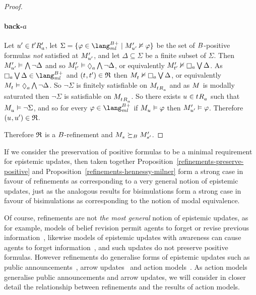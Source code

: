 \begin{proof}
\paragraph{back-$a$}
Let ${u}^{\prime} \in {{t}^{\prime}} {R^{\prime}_{a}}$, let $\Sigma = \{\phi \in \langMlPlusBs \mid \kPModelP{\kStateUP} \nentails \phi\}$ be the set of $B$-positive formulas {\em not} satisfied at ${M^{\prime}_{{u}^{\prime}}}$, and let $\Delta \subseteq \Sigma$ be a finite subset of $\Sigma$.
Then ${M^{\prime}_{{u}^{\prime}}} \vDash \bigwedge \lnot \Delta$ and so $\kPModelP{\kStateTP} \entails \possibleA \bigwedge \lnot \Delta$, or equivalently $\kPModelP{\kStateTP} \nentails \necessaryA \bigvee \Delta$.
As $\necessaryA \bigvee \Delta \in \langMlPlusBs$ and $(\kStateT, \kStateTP) \in \refinement$ then $\kPModel{\kStateT} \nentails \necessaryA \bigvee \Delta$, or equivalently $\kPModel{\kStateT} \entails \possibleA \bigwedge \lnot \Delta$.
So $\lnot \Sigma$ is finitely satisfiable on $\kPModel{\kSuccessorsA{\kStateT}}$ and as $\kModel$ is modally saturated then $\lnot \Sigma$ is satisfiable on $\kPModel{\kSuccessorsA{\kStateT}}$.
So there exists $\kStateU \in \kSuccessorsA{\kStateT}$ such that $\kPModel{\kStateU} \entails \lnot \Sigma$, and so for every $\phi \in \langMlPlusBs$ if $\kPModel{\kStateU} \entails \phi$ then ${M^{\prime}_{{u}^{\prime}}} \vDash \varphi$.
Therefore $(\kStateU, \kStateUP) \in \refinement$.

Therefore $\mathfrak{R}$ is a $B$-refinement and $\kPModel{\kStateS} \simulatesBs \kPModelP{\kStateSP}$.
\end{proof}

If we consider the preservation of positive formulas to be a minimal requirement for epistemic updates, then taken together Proposition~\ref{refinements-preserve-positive} and Proposition~\ref{refinements-hennessy-milner} form a strong case in favour of refinements as corresponding to a very general notion of epistemic updates, just as the analogous results for bisimulations form a strong case in favour of bisimulations as corresponding to the notion of modal equivalence.

Of course, refinements are not {\em the most general} notion of epistemic updates, as for example, models of belief revision permit agents to forget or revise previous information~\cite{alchourron:1985}, likewise models of epistemic updates with awareness can cause agents to forget information~\cite{vanditmarsch:2012}, and such updates do not preserve positive formulas.
However refinements do generalise forms of epistemic updates such as public announcements~\cite{plaza:1989,gerbrandy:1997}, arrow updates~\cite{kooi:2011a} and action models~\cite{baltag:1999, baltag:2004}.
As action models generalise public announcements and arrow updates, we will consider in closer detail the relationship between refinements and the results of action models.


